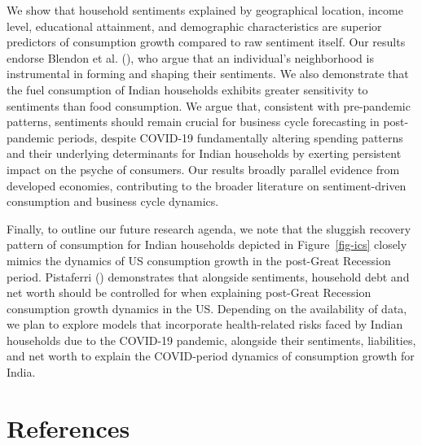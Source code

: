\documentclass[
  abstract]{scrartcl}
\begin{document}
We show that household sentiments explained by geographical location,
income level, educational attainment, and demographic characteristics
are superior predictors of consumption growth compared to raw sentiment
itself. Our results endorse Blendon et al.
(), who argue that an individual's
neighborhood is instrumental in forming and shaping their sentiments. We
also demonstrate that the fuel consumption of Indian households exhibits
greater sensitivity to sentiments than food consumption. We argue that,
consistent with pre-pandemic patterns, sentiments should remain crucial
for business cycle forecasting in post-pandemic periods, despite
COVID-19 fundamentally altering spending patterns and their underlying
determinants for Indian households by exerting persistent impact on the
psyche of consumers. Our results broadly parallel evidence from
developed economies, contributing to the broader literature on
sentiment-driven consumption and business cycle dynamics.

Finally, to outline our future research agenda, we note that the
sluggish recovery pattern of consumption for Indian households depicted
in Figure~\ref{fig-ics} closely mimics the dynamics of US consumption
growth in the post-Great Recession period. Pistaferri
() demonstrates that alongside
sentiments, household debt and net worth should be controlled for when
explaining post-Great Recession consumption growth dynamics in the US.
Depending on the availability of data, we plan to explore models that
incorporate health-related risks faced by Indian households due to the
COVID-19 pandemic, alongside their sentiments, liabilities, and net
worth to explain the COVID-period dynamics of consumption growth for
India.

\section*{References}\label{references}
\end{document}

